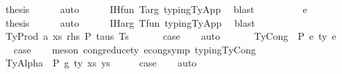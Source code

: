 \begin{isabellebody}
\ {\isacharquery}{\kern0pt}thesis\isanewline
\ \ \ \ \isamarkupfalse%
\ auto\isanewline
\ \ \ \ \isamarkupfalse%
\ IH{\isacharunderscore}{\kern0pt}fun\ T{\isacharunderscore}{\kern0pt}arg\ typing{\isachardot}{\kern0pt}TyApp\ \isamarkupfalse%
\ blast\isanewline
\ \ \isamarkupfalse%
\isanewline
\ \ \ \ \isamarkupfalse%
\ {\isacharparenleft}{\kern0pt}{}\ e{\isacharprime}{\kern0pt}{\isacharparenright}{\kern0pt}\isanewline
\ \ \ \ \isamarkupfalse%
\ \isamarkupfalse%
\ {\isacharquery}{\kern0pt}thesis\isanewline
\ \ \ \ \isamarkupfalse%
\ auto\isanewline
\ \ \ \ \isamarkupfalse%
\ IH{\isacharunderscore}{\kern0pt}arg\ T{\isacharunderscore}{\kern0pt}fun\ typing{\isachardot}{\kern0pt}TyApp\ \isamarkupfalse%
\ blast\isanewline
\ \ \isamarkupfalse%
\isanewline
{}\isamarkupfalse%
\isanewline
\ \ \isamarkupfalse%
\ {\isacharparenleft}{\kern0pt}TyProd\ a\ xs\ rhs\ P\ taus\ Ts\ {\isasymGamma}{\isacharparenright}{\kern0pt}\isanewline
\ \ \isamarkupfalse%
\ \isamarkupfalse%
\ {\isacharquery}{\kern0pt}case\isanewline
\ \ \isamarkupfalse%
\ auto\isanewline
\ \ \isamarkupfalse%
\isanewline
{}\isamarkupfalse%
\isanewline
\ \ \isamarkupfalse%
\ {\isacharparenleft}{\kern0pt}TyCong\ {\isasymGamma}\ P\ e{}\ ty\ e{}{\isacharparenright}{\kern0pt}\isanewline
\ \ \isamarkupfalse%
\ \isamarkupfalse%
\ {\isacharquery}{\kern0pt}case\isanewline
\ \ \isamarkupfalse%
\ {\isacharparenleft}{\kern0pt}meson\ cong{\isacharunderscore}{\kern0pt}reduce{\isacharunderscore}{\kern0pt}ty\ econg{\isacharunderscore}{\kern0pt}symp\ typing{\isachardot}{\kern0pt}TyCong{\isacharparenright}{\kern0pt}\isanewline
{}\isamarkupfalse%
\isanewline
\ \ \isamarkupfalse%
\ {\isacharparenleft}{\kern0pt}TyAlpha\ {\isasymGamma}{}\ P\ g\ ty\ xs\ ys{\isacharparenright}{\kern0pt}\isanewline
\ \ \isamarkupfalse%
\ \isamarkupfalse%
\ {\isacharquery}{\kern0pt}case\isanewline
\ \ \isamarkupfalse%
\ auto\isanewline
\ \ \isamarkupfalse%
\isanewline
{}\isamarkupfalse%
\isanewline
\ \ \isamarkupfalse%

\end{isabellebody}

